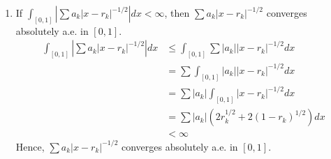 \documentclass[a4paper,11pt]{article}
\begin{document}
\begin{enumerate}
\begin{enumerate}
 \item
 If $\int_{[0,1]} \left|\sum a_k |x-r_k|^{-1/2} \right| dx < \infty$, then $\sum a_k |x - r_k|^{-1/2}$ converges absolutely a.e. in $[0,1]$.\\
 $$\begin{aligned}
 \int_{[0,1]} \left| \sum a_k |x-r_k|^{-1/2} \right| dx
 &\leq \int_{[0,1]} \sum |a_k| |x-r_k|^{-1/2} dx\\
 &= \sum \int_{[0,1]} |a_k| |x-r_k|^{-1/2} dx\\
 &= \sum |a_k| \int_{[0,1]} |x-r_k|^{-1/2} dx\\
 &= \sum |a_k| (2r_k^{1/2} + 2(1-r_k)^{1/2}) dx\\
 &< \infty
 \end{aligned}$$
 Hence, $\sum a_k |x - r_k|^{-1/2}$ converges absolutely a.e. in $[0,1]$.\\

 \end{enumerate}

\end{enumerate}
\end{document}
